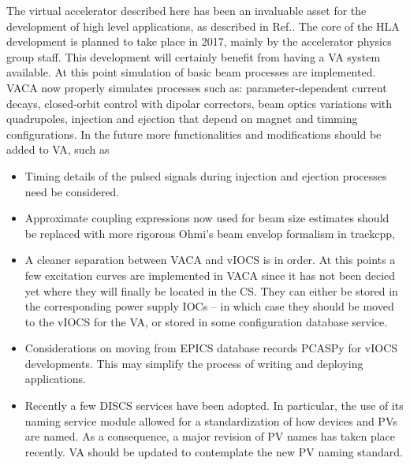 \documentclass[a4paper,
              ]{jacow}
\begin{document}
The virtual accelerator described here has been an invaluable asset for the development of high level applications, as described in Ref.\cite{sirius_hla}.
The core of the HLA development is planned to take place in 2017, mainly by the accelerator physics group staff. This development will certainly benefit from having a VA system available.
At this point simulation of basic beam processes are implemented.
VACA now properly simulates processes such as: parameter-dependent current decays, closed-orbit control with dipolar correctors, beam optics variations with quadrupoles, injection and ejection that depend on magnet and timming configurations.
In the future more functionalities and modifications should be added to VA, such as
\begin{itemize}
\item Timing details of the pulsed signals during injection and ejection processes need be considered.
\item Approximate coupling expressions now used for beam size estimates should be replaced with more rigorous Ohmi's beam envelop formalism\cite{ohmi} in trackcpp,
\item A cleaner separation between VACA and vIOCS is in order. At this points a few excitation curves are implemented in VACA since it has not been decied yet where they will finally be located in the CS. They can either be stored in the corresponding power supply IOCs -- in which case they should be moved to the vIOCS for the VA, or stored in some configuration database service.
\item Considerations on moving from EPICS database records PCASPy for vIOCS developments. This may simplify the process of writing and deploying applications.
\item Recently a few DISCS\cite{discs} services have been adopted. In particular, the use of its naming service module allowed for a standardization of how devices and PVs are named. As a consequence, a major revision of PV names has taken place recently. VA should be updated to contemplate the new PV naming standard.
\end{itemize}
\end{document}
